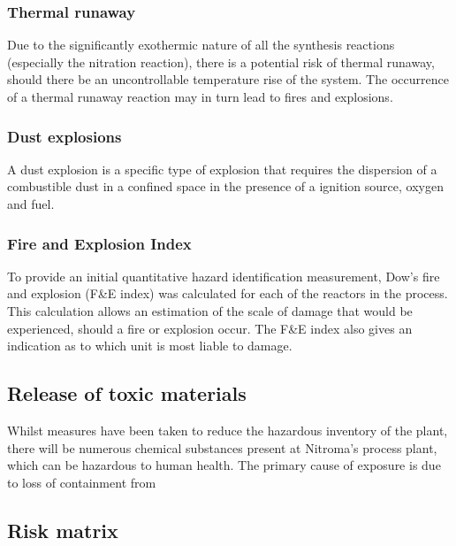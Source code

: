 \subsubsection{Thermal runaway}

Due to the significantly exothermic nature of all the synthesis reactions (especially the nitration reaction), there is a potential risk of thermal runaway, should there be an uncontrollable temperature rise of the system. The occurrence of a thermal runaway reaction may in turn lead to fires and explosions. 



\subsubsection{Dust explosions}

A dust explosion is a specific type of explosion that requires the dispersion of a combustible dust in a confined space in the presence of a ignition source, oxygen and fuel.



\subsubsection{Fire and Explosion Index}

To provide an initial quantitative hazard identification measurement, Dow's fire and explosion (F\&E index) was calculated for each of the reactors in the process. This calculation allows an estimation of the scale of damage that would be experienced, should a fire or explosion occur. The F\&E index also gives an indication as to which unit is most liable to damage. 


\subsection{Release of toxic materials}

Whilst measures have been taken to reduce the hazardous inventory of the plant, there will be numerous chemical substances present at Nitroma's process plant, which can be hazardous to human health. The primary cause of exposure is due to loss of containment from 

\subsection{Risk matrix}